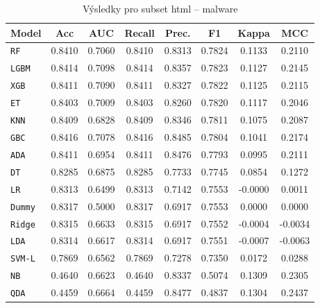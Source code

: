 \begin{table}[H]
  \centering
  \small
  \caption{Výsledky pro subset html – malware}
  \begin{tabular}{|l|c|c|c|c|c|c|c|}
    \hline
    \textbf{Model} & \textbf{Acc} & \textbf{AUC} & \textbf{Recall} & \textbf{Prec.} & \textbf{F1} & \textbf{Kappa} & \textbf{MCC} \\
    \hline
    \texttt{RF} & 0.8410 & 0.7060 & 0.8410 & 0.8313 & 0.7824 & 0.1133 & 0.2110 \\
    \texttt{LGBM} & 0.8414 & 0.7098 & 0.8414 & 0.8357 & 0.7823 & 0.1127 & 0.2145 \\
    \texttt{XGB} & 0.8411 & 0.7090 & 0.8411 & 0.8327 & 0.7822 & 0.1125 & 0.2115 \\
    \texttt{ET} & 0.8403 & 0.7009 & 0.8403 & 0.8260 & 0.7820 & 0.1117 & 0.2046 \\
    \texttt{KNN} & 0.8409 & 0.6828 & 0.8409 & 0.8346 & 0.7811 & 0.1075 & 0.2087 \\
    \texttt{GBC} & 0.8416 & 0.7078 & 0.8416 & 0.8485 & 0.7804 & 0.1041 & 0.2174 \\
    \texttt{ADA} & 0.8411 & 0.6954 & 0.8411 & 0.8476 & 0.7793 & 0.0995 & 0.2111 \\
    \texttt{DT} & 0.8285 & 0.6875 & 0.8285 & 0.7733 & 0.7745 & 0.0854 & 0.1272 \\
    \texttt{LR} & 0.8313 & 0.6499 & 0.8313 & 0.7142 & 0.7553 & -0.0000 & 0.0011 \\
    \texttt{Dummy} & 0.8317 & 0.5000 & 0.8317 & 0.6917 & 0.7553 & 0.0000 & 0.0000 \\
    \texttt{Ridge} & 0.8315 & 0.6633 & 0.8315 & 0.6917 & 0.7552 & -0.0004 & -0.0034 \\
    \texttt{LDA} & 0.8314 & 0.6617 & 0.8314 & 0.6917 & 0.7551 & -0.0007 & -0.0063 \\
    \texttt{SVM-L} & 0.7869 & 0.6562 & 0.7869 & 0.7278 & 0.7350 & 0.0172 & 0.0288 \\
    \texttt{NB} & 0.4640 & 0.6623 & 0.4640 & 0.8337 & 0.5074 & 0.1309 & 0.2305 \\
    \texttt{QDA} & 0.4459 & 0.6664 & 0.4459 & 0.8477 & 0.4837 & 0.1304 & 0.2437 \\
    \hline
  \end{tabular}
\end{table}
\vspace{0.5cm}

